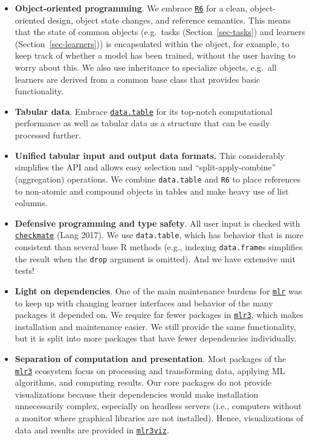 \begin{itemize}
\tightlist
\item
  \textbf{Object-oriented programming}. We embrace
  \href{https://cran.r-project.org/package=R6}{\texttt{R6}} for a clean,
  object-oriented design, object state changes, and reference semantics.
  This means that the state of common objects (e.g.~tasks
  (Section~\ref{sec-tasks}) and learners (Section~\ref{sec-learners}))
  is encapsulated within the object, for example, to keep track of
  whether a model has been trained, without the user having to worry
  about this. We also use inheritance to specialize objects, e.g.~all
  learners are derived from a common base class that provides basic
  functionality.
\item
  \textbf{Tabular data}. Embrace
  \href{https://cran.r-project.org/package=data.table}{\texttt{data.table}}
  for its top-notch computational performance as well as tabular data as
  a structure that can be easily processed further.
\item
  \textbf{Unified tabular input and output data formats.} This
  considerably simplifies the API and allows easy selection and
  ``split-apply-combine'' (aggregation) operations. We combine
  \texttt{data.table} and \texttt{R6} to place references to non-atomic
  and compound objects in tables and make heavy use of list columns.
\item
  \textbf{Defensive programming and type safety}. All user input is
  checked with
  \href{https://cran.r-project.org/package=checkmate}{\texttt{checkmate}}
  (Lang 2017). We use \texttt{data.table}, which has behavior that is
  more consistent than several base R methods (e.g., indexing
  \texttt{data.frame}s simplifies the result when the \texttt{drop}
  argument is omitted). And we have extensive unit tests!
\item
  \textbf{Light on dependencies}. One of the main maintenance burdens
  for \href{https://cran.r-project.org/package=mlr}{\texttt{mlr}} was to
  keep up with changing learner interfaces and behavior of the many
  packages it depended on. We require far fewer packages in
  \href{https://mlr3.mlr-org.com}{\texttt{mlr3}},
  which makes installation and maintenance easier. We still provide the
  same functionality, but it is split into more packages that have fewer
  dependencies individually.
\item
  \textbf{Separation of computation and presentation}. Most packages of
  the
  \href{https://mlr3.mlr-org.com}{\texttt{mlr3}}
  ecosystem focus on processing and transforming data, applying ML
  algorithms, and computing results. Our core packages do not provide
  visualizations because their dependencies would make installation
  unnecessarily complex, especially on headless servers (i.e., computers
  without a monitor where graphical libraries are not installed). Hence,
  visualizations of data and results are provided in
  \href{https://mlr3viz.mlr-org.com}{\texttt{mlr3viz}}.
\end{itemize}

